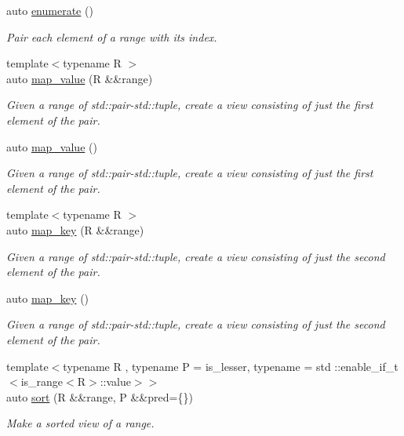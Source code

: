 \begin{DoxyCompactItemize}
auto \mbox{\hyperlink{namespacerah_1_1view_a592731562abd27c9c71f744885322545}{enumerate}} ()
\begin{DoxyCompactList}\small\item\em Pair each element of a range with its index. \end{DoxyCompactList}\item 
{\footnotesize template$<$typename R $>$ }\\auto \mbox{\hyperlink{namespacerah_1_1view_abde9f999ff37f8b31f7a25598f2b4a25}{map\+\_\+value}} (R \&\&range)
\begin{DoxyCompactList}\small\item\em Given a range of std\+::pair-\/std\+::tuple, create a view consisting of just the first element of the pair. \end{DoxyCompactList}\item 
auto \mbox{\hyperlink{namespacerah_1_1view_ae022a4f4c20c2d288b5fa1c68441fb8f}{map\+\_\+value}} ()
\begin{DoxyCompactList}\small\item\em Given a range of std\+::pair-\/std\+::tuple, create a view consisting of just the first element of the pair. \end{DoxyCompactList}\item 
{\footnotesize template$<$typename R $>$ }\\auto \mbox{\hyperlink{namespacerah_1_1view_a30b890451bfedbb15ed2114ed62beebc}{map\+\_\+key}} (R \&\&range)
\begin{DoxyCompactList}\small\item\em Given a range of std\+::pair-\/std\+::tuple, create a view consisting of just the second element of the pair. \end{DoxyCompactList}\item 
auto \mbox{\hyperlink{namespacerah_1_1view_aa42d84e34eaf06e2d04d650d1483ac68}{map\+\_\+key}} ()
\begin{DoxyCompactList}\small\item\em Given a range of std\+::pair-\/std\+::tuple, create a view consisting of just the second element of the pair. \end{DoxyCompactList}\item 
{\footnotesize template$<$typename R , typename P  = is\+\_\+lesser, typename  = std \+::enable\+\_\+if\+\_\+t$<$is\+\_\+range$<$\+R$>$\+::value$>$$>$ }\\auto \mbox{\hyperlink{namespacerah_1_1view_a343ff36ca2b6470f2a55a89dfb4e3dc9}{sort}} (R \&\&range, P \&\&pred=\{\})
\begin{DoxyCompactList}\small\item\em Make a sorted view of a range. \end{DoxyCompactList}\item 

\end{DoxyCompactItemize}

